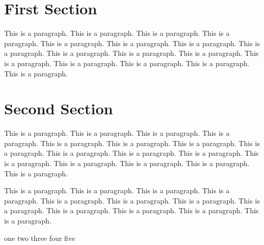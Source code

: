 \documentclass{article}
\begin{document}
\section{First Section}

This is a paragraph. This is a paragraph. This is a paragraph. This is a paragraph. 
This is a paragraph. This is a paragraph. This is a paragraph. This is a paragraph. 
This is a paragraph. This is a paragraph. This is a paragraph. This is a paragraph. 
This is a paragraph. This is a paragraph. This is a paragraph. This is a paragraph. 

\section{Second Section}

This is a paragraph. This is a paragraph. This is a paragraph. This is a paragraph. 
This is a paragraph. This is a paragraph. This is a paragraph. This is a paragraph. 
This is a paragraph. This is a paragraph. This is a paragraph. This is a paragraph. 
This is a paragraph. This is a paragraph. This is a paragraph. This is a paragraph. 

This is a paragraph. This is a paragraph. This is a paragraph. This is a paragraph. 
This is a paragraph. This is a paragraph. This is a paragraph. This is a paragraph. 
This is a paragraph. This is a paragraph. This is a paragraph. This is a paragraph. 

\begin{algorithm}[H]
    one \;%
    two \;%
    three \;%
    four \;%
    five \;%
\end{algorithm}
\end{document}
